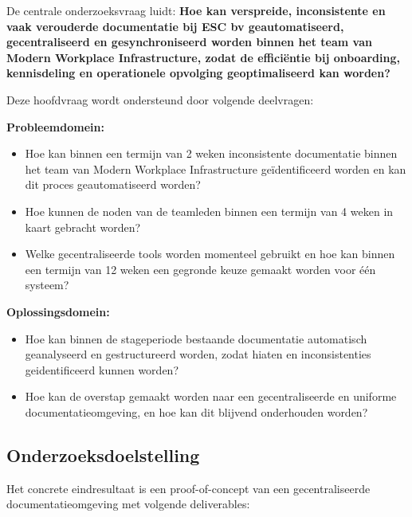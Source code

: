 De centrale onderzoeksvraag luidt: \textbf{Hoe kan verspreide, inconsistente en vaak verouderde documentatie bij ESC bv geautomatiseerd, gecentraliseerd en gesynchroniseerd worden binnen het team van Modern Workplace Infrastructure, zodat de efficiëntie bij onboarding, kennisdeling en operationele opvolging geoptimaliseerd kan worden?}

Deze hoofdvraag wordt ondersteund door volgende deelvragen:

\textbf{Probleemdomein:}
\begin{itemize}
  \item Hoe kan binnen een termijn van 2 weken inconsistente documentatie binnen het team van Modern Workplace Infrastructure ge\-ïdentificeerd worden en kan dit proces geautomatiseerd worden?
  \item Hoe kunnen de noden van de teamleden binnen een termijn van 4 weken in kaart gebracht worden?
  \item Welke gecentraliseerde tools worden momenteel gebruikt en hoe kan binnen een termijn van 12 weken een gegronde keuze gemaakt worden voor één systeem?
\end{itemize}

\textbf{Oplossingsdomein:}
\begin{itemize}
  \item Hoe kan binnen de stageperiode bestaande documentatie automatisch geanalyseerd en gestructureerd worden, zodat hiaten en inconsistenties ge\-identificeerd kunnen worden?
  \item Hoe kan de overstap gemaakt worden naar een gecentraliseerde en uniforme documentatie\-omgeving, en hoe kan dit blijvend onderhouden worden?
\end{itemize}

\subsection{Onderzoeksdoelstelling}

Het concrete eindresultaat is een proof-of-con\-cept van een gecentraliseerde documentatie\-omgeving met volgende deliverables:

